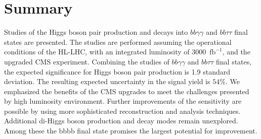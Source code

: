 \section{Summary}
\label{sec:conclusion}
Studies  of the Higgs boson pair production and decays into $bb\gamma\gamma$ and $bb\tau\tau$ final states are presented. The studies are performed assuming the operational conditions of the HL-LHC, with an integrated luminosity of 3000~$\mathrm{fb}^{-1}$, and the upgraded CMS experiment. Combining the studies of $bb\gamma\gamma$ and $bb\tau\tau$ final states, the expected significance for Higgs boson pair production is 1.9 standard deviation. The resulting expected uncertainty in the signal yield is $54\%$. We emphasized the benefits of the CMS \phasetwo upgrades to meet the challenges presented by high luminosity environment. Further improvements of the sensitivity are possible by using more sophisticated reconstruction and analysis techniques. Additional di-Higgs boson production and decay modes remain unexplored. Among these the bbbb final state promises the largest potential for improvement.

